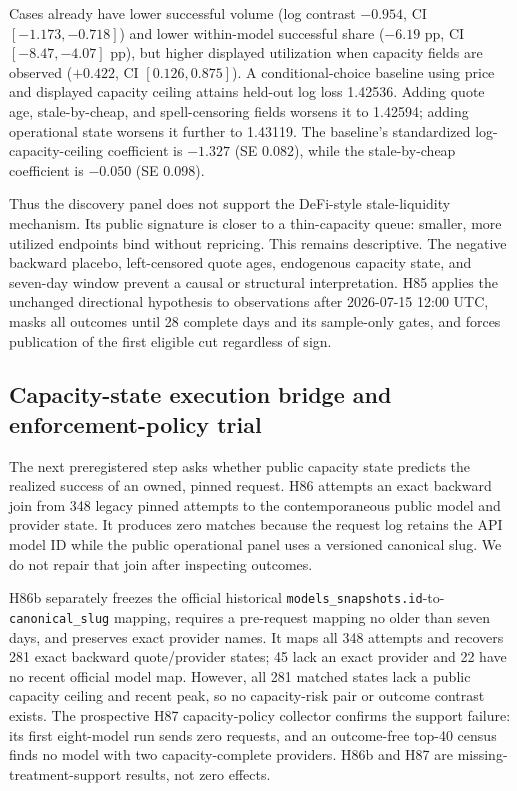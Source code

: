 \documentclass[11pt]{article}
\theoremstyle{definition}
\begin{document}
Cases already have lower successful volume (log contrast $-0.954$, CI
$[-1.173,-0.718]$) and lower within-model successful share ($-6.19$ pp, CI
$[-8.47,-4.07]$ pp), but higher displayed utilization when capacity fields are
observed ($+0.422$, CI $[0.126,0.875]$). A conditional-choice baseline using
price and displayed capacity ceiling attains held-out log loss 1.42536.
Adding quote age, stale-by-cheap, and spell-censoring fields worsens it to
1.42594; adding operational state worsens it further to 1.43119. The baseline's
standardized log-capacity-ceiling coefficient is $-1.327$ (SE 0.082), while the
stale-by-cheap coefficient is $-0.050$ (SE 0.098).

Thus the discovery panel does not support the DeFi-style stale-liquidity
mechanism. Its public signature is closer to a thin-capacity queue: smaller,
more utilized endpoints bind without repricing. This remains descriptive. The
negative backward placebo, left-censored quote ages, endogenous capacity
state, and seven-day window prevent a causal or structural interpretation. H85
applies the unchanged directional hypothesis to observations after 2026-07-15
12:00 UTC, masks all outcomes until 28 complete days and its sample-only gates,
and forces publication of the first eligible cut regardless of sign.

\subsection{Capacity-state execution bridge and enforcement-policy trial}

The next preregistered step asks whether public capacity state predicts the
realized success of an owned, pinned request. H86 attempts an exact backward
join from 348 legacy pinned attempts to the contemporaneous public model and
provider state. It produces zero matches because the request log retains the
API model ID while the public operational panel uses a versioned canonical
slug. We do not repair that join after inspecting outcomes.

H86b separately freezes the official historical
\texttt{models\_snapshots.id}-to-\texttt{canonical\_slug} mapping, requires a
pre-request mapping no older than seven days, and preserves exact provider
names. It maps all 348 attempts and recovers 281 exact backward quote/provider
states; 45 lack an exact provider and 22 have no recent official model map.
However, all 281 matched states lack a public capacity ceiling and recent peak,
so no capacity-risk pair or outcome contrast exists. The prospective H87
capacity-policy collector confirms the support failure: its first eight-model
run sends zero requests, and an outcome-free top-40 census finds no model with
two capacity-complete providers. H86b and H87 are missing-treatment-support
results, not zero effects.
\end{document}
